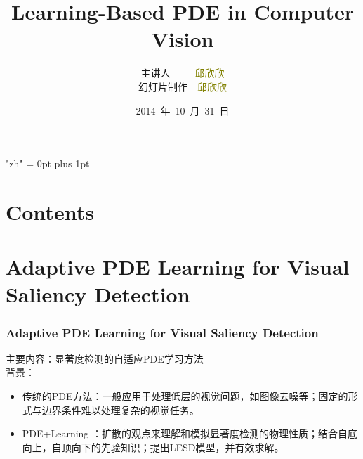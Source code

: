 \documentclass[notheorems,mathserif,table,compress]{beamer}  %
\begin{document}
\XeTeXlinebreaklocale "zh"         %
\XeTeXlinebreakskip = 0pt plus 1pt %


\title{Learning-Based PDE in Computer Vision}
\author[Qiu]{主讲人~~~~~\textcolor{olive}{邱欣欣}\\
    \quad 幻灯片制作~~\textcolor{olive}{邱欣欣}}
\institute[中国海洋大学]{\small\textcolor{violet}{中国海洋大学~~信息科学与工程学院}}
\date{2014~年~10~月~31~日}
\frame{ \titlepage }
\section*{Contents}
\section{Adaptive PDE Learning for Visual Saliency Detection}

%
\begin{frame}
\frametitle{Adaptive PDE Learning for Visual Saliency Detection}
主要内容：显著度检测的自适应PDE学习方法\\
背景：
\begin{itemize}
\item 传统的PDE方法：一般应用于处理低层的视觉问题，如图像去噪等；固定的形式与边界条件难以处理复杂的视觉任务。
\item PDE+Learning ：扩散的观点来理解和模拟显著度检测的物理性质；结合自底向上，自顶向下的先验知识；提出LESD模型，并有效求解。
\end{itemize}
\end{frame}
\end{document}
